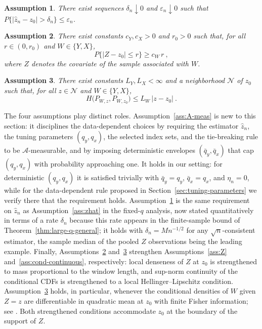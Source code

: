 \documentclass[11pt]{article}
\numberwithin{equation}{section}
\newtheorem{assumption}{Assumption}%
\begin{document}
\begin{assumption}\label{ass:zhat-rate}
There exist sequences $\delta_n\downarrow0$ and $\varepsilon_n\downarrow0$ such that $P\{|\hat z_n-z_0|>\delta_n\}\le\varepsilon_n$.
\end{assumption}

\begin{assumption}\label{ass:local-mass}
There exist constants $c_Y,c_X>0$ and $r_0>0$ such that, for all $r\in(0,r_0)$ and $W\in\{Y,X\}$,
\begin{equation*}
 P\{|Z-z_0|\le r\}\ge c_W\,r~,
\end{equation*}
where $Z$ denotes the covariate of the sample associated with $W$.
\end{assumption}

\begin{assumption}\label{ass:hellinger}
There exist constants $L_Y,L_X<\infty$ and a neighborhood $\mathcal N$ of $z_0$ such that, for all $z\in\mathcal N$ and $W\in\{Y,X\}$,
\begin{equation*}
 H\big(P_{W,z},P_{W,z_0}\big)\le L_W\,|z-z_0|~.
\end{equation*}
\end{assumption}

The four assumptions play distinct roles. Assumption~\ref{ass:A-meas} is new to this section: it disciplines the data-dependent choices by requiring the estimator $\hat z_n$, the tuning parameters $(q_y,q_x)$, the selected index sets, and the tie-breaking rule to be $\mathcal A$-measurable, and by imposing deterministic envelopes $(\bar q_y,\bar q_x)$ that cap $(q_y,q_x)$ with probability approaching one. It holds in our setting: for deterministic $(q_y,q_x)$ it is satisfied trivially with $\bar q_y=q_y$, $\bar q_x=q_x$, and $\eta_n=0$, while for the data-dependent rule proposed in Section~\ref{sec:tuning-parameters} we verify there that the requirement holds. Assumption~\ref{ass:zhat-rate} is the same requirement on $\hat z_n$ as Assumption~\ref{ass:zhat} in the fixed-$q$ analysis, now stated quantitatively in terms of a rate $\delta_n$ because this rate appears in the finite-sample bound of Theorem~\ref{thm:large-q-general}; it holds with $\delta_n=Mn^{-1/2}$ for any $\sqrt{n}$-consistent estimator, the sample median of the pooled $Z$ observations being the leading example. Finally, Assumptions~\ref{ass:local-mass} and~\ref{ass:hellinger} strengthen Assumptions~\ref{ass:Z} and~\ref{ass:cond-continuous}, respectively: local denseness of $Z$ at $z_0$ is strengthened to mass proportional to the window length, and sup-norm continuity of the conditional CDFs is strengthened to a local Hellinger--Lipschitz condition. Assumption~\ref{ass:hellinger} holds, in particular, whenever the conditional densities of $W$ given $Z=z$ are differentiable in quadratic mean at $z_0$ with finite Fisher information; see \citet{bugni/canay/kim:26b}. Both strengthened conditions accommodate $z_0$ at the boundary of the support of $Z$.
\end{document}
